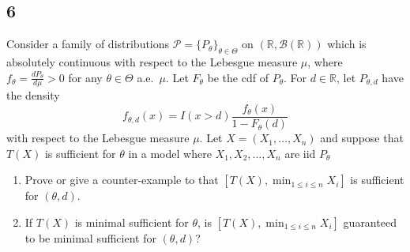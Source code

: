 \documentclass[12pt]{article}
\begin{document}
\subsection*{6}
\begin{tcolorbox}
  Consider a family of distributions $\mathcal{P}=\{P_\theta\}_{\theta\in \Theta}$ on $(\mathbb{R},\mathcal{B}(\mathbb{R}))$ which is absolutely continuous with respect to the Lebesgue measure $\mu$, where $f_\theta=\frac{d P_\theta}{d \mu}>0$ for any $\theta\in \Theta$ a.e.~$\mu$.  Let $F_\theta$ be the cdf of $P_\theta$.  For $d\in \mathbb{R}$, let $P_{\theta,d}$ have the density
  \[
    f_{\theta,d}(x) = I(x>d) \frac{f_\theta(x)}{1-F_\theta(d)}
  \]
  with respect to the Lebesgue measure $\mu$.  Let $X=(X_1,\ldots,X_n)$ and suppose that $T(X)$ is sufficient for $\theta$ in a model where $X_1,X_2,\ldots,X_n$ are iid $P_\theta$

  \begin{enumerate}
    \item Prove or give a counter-example to that $[T(X),\min_{1\leq i \leq n} X_i]$ is sufficient for $(\theta,d)$.
    \item If $T(X)$ is minimal sufficient for $\theta$, is $[T(X),\min_{1\leq i \leq n} X_i]$ guaranteed to be minimal sufficient for $(\theta,d)$?
  \end{enumerate}
\end{tcolorbox}
\end{document}
